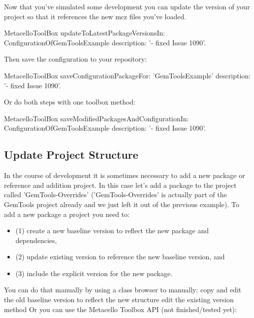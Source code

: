 \documentclass[a4paper,10pt,twoside]{book}
\begin{document}
Now that you've simulated some development you can update the  version of your project so that it references the new mcz files you've loaded.

\begin{code}{}
MetacelloToolBox
  updateToLatestPackageVersionsIn: ConfigurationOfGemToolsExample
  description: '- fixed Issue 1090'.
 \end{code} 
 
Then save the configuration to your repository:

\begin{code}{}
MetacelloToolBox
  saveConfigurationPackageFor: 'GemToolsExample'
  description: '- fixed Issue 1090'.
 \end{code}
   
Or do both steps with one toolbox method:

\begin{code}{}
MetacelloToolBox
  saveModifiedPackagesAndConfigurationIn: ConfigurationOfGemToolsExample
  description: '- fixed Issue 1090'.
\end{code}
  
\subsection{Update Project Structure}

In the course of development it is sometimes necessary to add a new package or reference and addition project. In this case let's add a package to the project called 'GemTools-Overrides' ('GemTools-Overrides' is actually part of the GemTools project already and we just left it out of the previous example). To add a new package a project you need to:

\begin{itemize}
\item (1) create a new baseline version to reflect the new package and dependencies, 
\item (2) update existing  version to reference the new baseline version, and 
\item (3) include the explicit version for the new package.
\end{itemize}

You can do that manually by using a class browser to manually:
copy and edit the old baseline version to reflect the new structure
edit the existing  version method
Or you can use the Metacello Toolbox API (not finished/tested yet):
\end{document}
